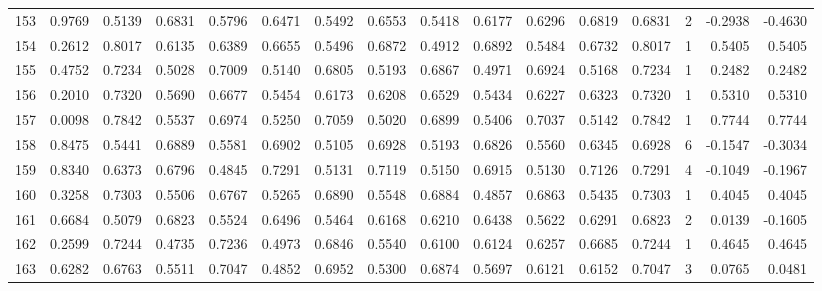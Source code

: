 \begin{tabular}{lrrrrrrrrrrrrrrr}
153 &      0.9769 &  0.5139 &  0.6831 &  0.5796 &  0.6471 &  0.5492 &  0.6553 &  0.5418 &  0.6177 &  0.6296 &   0.6819 &     0.6831 &      2 &                   -0.2938 &                    -0.4630 \\
154 &      0.2612 &  0.8017 &  0.6135 &  0.6389 &  0.6655 &  0.5496 &  0.6872 &  0.4912 &  0.6892 &  0.5484 &   0.6732 &     0.8017 &      1 &                    0.5405 &                     0.5405 \\
155 &      0.4752 &  0.7234 &  0.5028 &  0.7009 &  0.5140 &  0.6805 &  0.5193 &  0.6867 &  0.4971 &  0.6924 &   0.5168 &     0.7234 &      1 &                    0.2482 &                     0.2482 \\
156 &      0.2010 &  0.7320 &  0.5690 &  0.6677 &  0.5454 &  0.6173 &  0.6208 &  0.6529 &  0.5434 &  0.6227 &   0.6323 &     0.7320 &      1 &                    0.5310 &                     0.5310 \\
157 &      0.0098 &  0.7842 &  0.5537 &  0.6974 &  0.5250 &  0.7059 &  0.5020 &  0.6899 &  0.5406 &  0.7037 &   0.5142 &     0.7842 &      1 &                    0.7744 &                     0.7744 \\
158 &      0.8475 &  0.5441 &  0.6889 &  0.5581 &  0.6902 &  0.5105 &  0.6928 &  0.5193 &  0.6826 &  0.5560 &   0.6345 &     0.6928 &      6 &                   -0.1547 &                    -0.3034 \\
159 &      0.8340 &  0.6373 &  0.6796 &  0.4845 &  0.7291 &  0.5131 &  0.7119 &  0.5150 &  0.6915 &  0.5130 &   0.7126 &     0.7291 &      4 &                   -0.1049 &                    -0.1967 \\
160 &      0.3258 &  0.7303 &  0.5506 &  0.6767 &  0.5265 &  0.6890 &  0.5548 &  0.6884 &  0.4857 &  0.6863 &   0.5435 &     0.7303 &      1 &                    0.4045 &                     0.4045 \\
161 &      0.6684 &  0.5079 &  0.6823 &  0.5524 &  0.6496 &  0.5464 &  0.6168 &  0.6210 &  0.6438 &  0.5622 &   0.6291 &     0.6823 &      2 &                    0.0139 &                    -0.1605 \\
162 &      0.2599 &  0.7244 &  0.4735 &  0.7236 &  0.4973 &  0.6846 &  0.5540 &  0.6100 &  0.6124 &  0.6257 &   0.6685 &     0.7244 &      1 &                    0.4645 &                     0.4645 \\
163 &      0.6282 &  0.6763 &  0.5511 &  0.7047 &  0.4852 &  0.6952 &  0.5300 &  0.6874 &  0.5697 &  0.6121 &   0.6152 &     0.7047 &      3 &                    0.0765 &                     0.0481 \\

\end{tabular}
